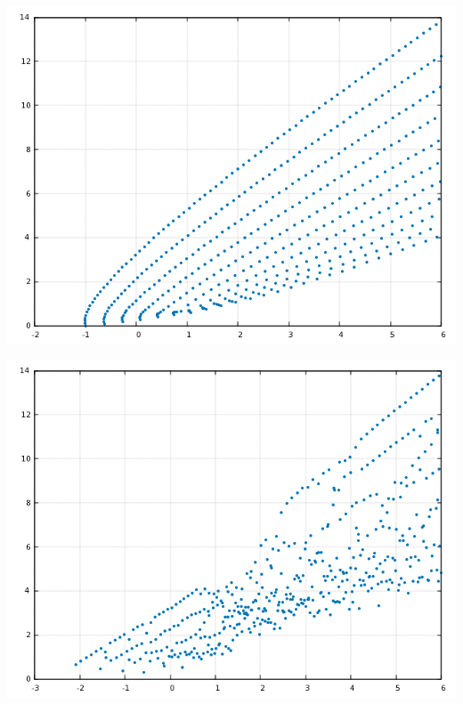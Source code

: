 \begin{center}
  \begin{minipage}[t]{.45\textwidth}
    \includegraphics[width=1\linewidth]{pictures/Inv2.png}
  \end{minipage}
\hfill
  \begin{minipage}[t]{.45\textwidth}
    \includegraphics[width=1\linewidth]{pictures/Inv.png}
  \end{minipage}
\end{center}

